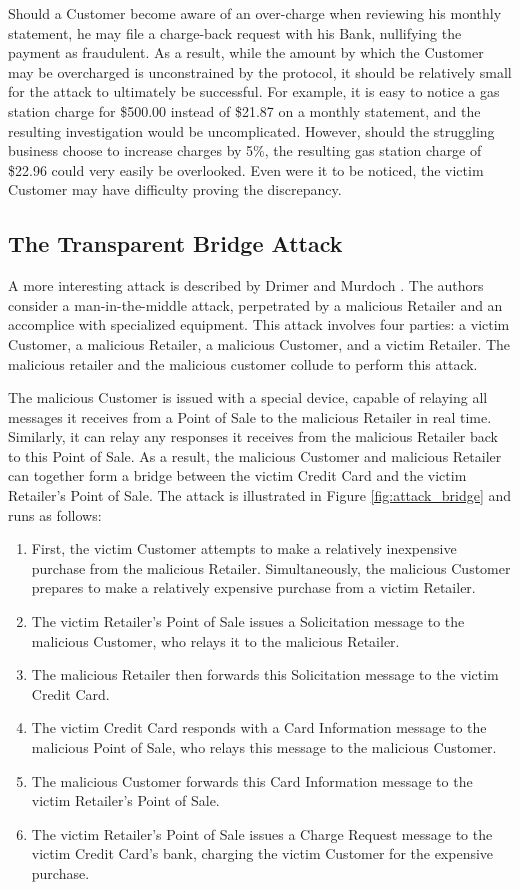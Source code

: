 Should a Customer become aware of an over-charge when reviewing his monthly statement, he may file a charge-back request with his Bank, nullifying the payment as fraudulent.
As a result, while the amount by which the Customer may be overcharged is unconstrained by the protocol, it should be relatively small for the attack to ultimately be successful.
For example, it is easy to notice a gas station charge for \$500.00 instead of \$21.87 on a monthly statement, and the resulting investigation would be uncomplicated.
However, should the struggling business choose to increase charges by 5\%, the resulting gas station charge of \$22.96 could very easily be overlooked.
Even were it to be noticed, the victim Customer may have difficulty proving the discrepancy.


\subsection{The Transparent Bridge Attack}

A more interesting attack is described by Drimer and Murdoch \cite{Drimer:2007:KYE:1362903.1362910}.
The authors consider a man-in-the-middle attack, perpetrated by a malicious Retailer and an accomplice with specialized equipment.
This attack involves four parties: a victim Customer, a malicious Retailer, a malicious Customer, and a victim Retailer.
The malicious retailer and the malicious customer collude to perform this attack.

The malicious Customer is issued with a special device, capable of relaying all messages it receives from a Point of Sale to the malicious Retailer in real time.
Similarly, it can relay any responses it receives from the malicious Retailer back to this Point of Sale.
As a result, the malicious Customer and malicious Retailer can together form a bridge between the victim Credit Card and the victim Retailer's Point of Sale.
The attack is illustrated in Figure \ref{fig:attack_bridge} and runs as follows:

\begin{enumerate}
\item First, the victim Customer attempts to make a relatively inexpensive purchase from the malicious Retailer.
Simultaneously, the malicious Customer prepares to make a relatively expensive purchase from a victim Retailer.
\item The victim Retailer's Point of Sale issues a Solicitation message to the malicious Customer, who relays it to the malicious Retailer.
\item The malicious Retailer then forwards this Solicitation message to the victim Credit Card.
\item The victim Credit Card responds with a Card Information message to the malicious Point of Sale, who relays this message to the malicious Customer.
\item The malicious Customer forwards this Card Information message to the victim Retailer's Point of Sale.
\item The victim Retailer's Point of Sale issues a Charge Request message to the victim Credit Card's bank, charging the victim Customer for the expensive purchase.
\end{enumerate}

